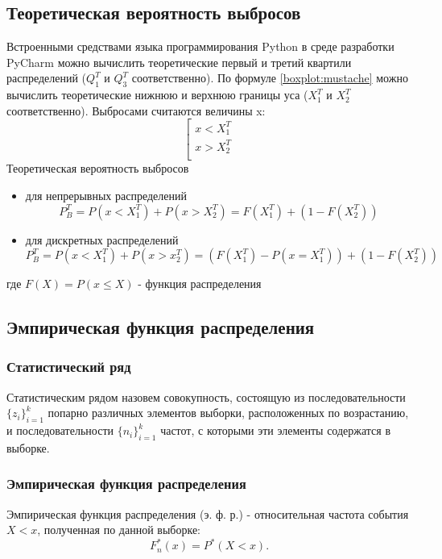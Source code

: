 \documentclass[main.tex]{subfiles}
\begin{document}
    \subsection{Теоретическая вероятность выбросов}
    \noindent Встроенными средствами языка программирования Python в среде разработки PyCharm можно вычислить теоретические первый и третий квартили распределений ($Q_1^T$ и $Q_3^T$ соответственно). По формуле \eqref{boxplot:mustache} можно вычислить теоретические нижнюю и верхнюю границы уса ($X_1^T$ и $X_2^T$ соответственно). Выбросами считаются величины x: 
    \begin{equation} \label{boxplot:emisssions}
    	\left[
    	\begin{gathered}
    		x < X_1^T \\
	    	x > X_2^T \\
    	\end{gathered}
    	\right.
    \end{equation}
        Теоретическая вероятность выбросов 
    \begin{itemize}
	    \item для непрерывных распределений
	\begin{equation} \label{boxplot:emisProbContin}
		P_B^T = P(x<X_1^T) + P(x>X_2^T)=F(X_1^T) + (1-F(X_2^T))
	\end{equation}
	    \item для дискретных распределений
    	\begin{equation}\label{boxplot:emisProbDiscr}
	    	P_B^T = P(x<X_1^T)+P(x>x_2^T)=(F(X_1^T)-P(x=X_1^T))+(1-F(X_2^T))
    \end{equation}
    \end{itemize}
        где $F(X) = P(x\leq{X})$ - функция распределения

    \subsection{Эмпирическая функция распределения}
    \subsubsection{Статистический ряд}
    \noindent Статистическим рядом назовем совокупность, состоящую из последовательности $\displaystyle\{z_i\}_{i=1}^k$ попарно различных элементов выборки, расположенных по возрастанию, и последовательности $\displaystyle\{n_i\}_{i=1}^k$ частот, с которыми эти элементы содержатся в выборке.
    \subsubsection{Эмпирическая функция распределения}
    \noindent Эмпирическая функция распределения (э. ф. р.) - относительная частота события $X < x$, полученная по данной выборке:
    \begin{equation} \label{empiricalFunc}
    	F_n^*(x)=P^*(X<x).
    \end{equation}
\end{document}
